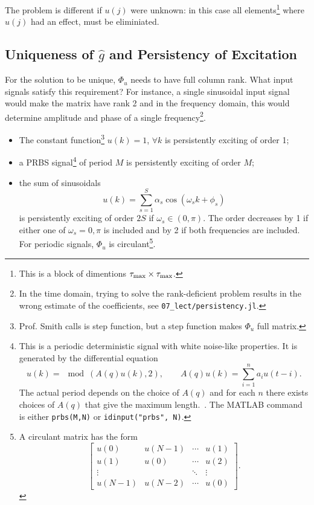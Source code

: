 The problem is different if $u(j)$ were unknown: in this case all elements\footnote{This is a block of dimentions $\tau_\text{max}\times \tau_\text{max}$.} where $u(j)$ had an effect, must be eliminiated.

\subsection{Uniqueness of $\hat{g}$ and Persistency of Excitation}
\label{sec:persistency-excitation}

For the solution to be unique, $\Phi_u$ needs to have full column rank. What input signals satisfy this requirement? For instance, a single sinusoidal input signal would make the matrix have rank 2 and in the frequency domain, this would determine amplitude and phase of a single frequency\footnote{In the time domain, trying to solve the rank-deficient problem results in the wrong estimate of the coefficients, see \texttt{07\_lect/persistency.jl}.}.

\begin{itemize}
\item The constant function\footnote{Prof. Smith calls is step function, but a step function makes $\Phi_u$ full matrix.} $u(k)=1$, $\forall k$ is persistently exciting of order 1;
\item a PRBS signal\footnote{This is a periodic deterministic signal with white noise-like properties. It is generated by the differential equation
    \begin{equation*}
      u(k) = \mod(A(q)u(k),2), \hspace{2em} A(q)u(k) = \sum_{i=1}^na_iu(t-i).
    \end{equation*}
    The actual period depends on the choice of $A(q)$ and for each $n$ there exists choices of $A(q)$ that give the maximum length.~\cite[Chap.~13]{ljung}. The MATLAB command is either \texttt{prbs(M,N)} or \texttt{idinput("prbs", N)}.} of period $M$ is persistently exciting of order $M$;
\item the sum of sinusoidals
  \begin{equation*}
    u(k) = \sum_{s=1}^S \alpha_s \cos(\omega_sk + \phi_s)
  \end{equation*}
  is persistently exciting of order $2S$ if $\omega_s\in (0,\pi)$. The order decreases by 1 if either one of $\omega_s = 0,\pi$ is included and by 2 if both frequencies are included. For periodic signals, $\Phi_u$ is circulant\footnote{A circulant matrix has the form
    \begin{equation*}
      \begin{bmatrix}
        u(0) & u(N-1) & \cdots & u(1) \\
        u(1) & u(0) & \cdots & u(2) \\
        \vdots & & \ddots & \vdots \\
        u(N-1) & u(N-2) & \cdots & u(0)
      \end{bmatrix}.
    \end{equation*}}.
\end{itemize}

